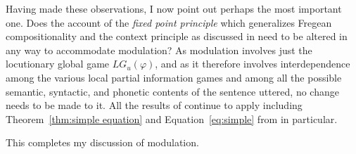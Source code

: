 Having made these observations, I now point out perhaps the most important one. Does the account of the \emph{fixed point principle} which generalizes Fregean compositionality and the context principle as discussed in  need to be altered in any way to accommodate modulation? As modulation involves just the locutionary global game $LG_u(\varphi)$, and as it therefore involves interdependence among the various local partial information games and among all the possible semantic, syntactic, and phonetic contents of the sentence uttered, no change needs to be made to it. All the results of  continue to apply including Theorem~\ref{thm:simple equation} and Equation~\ref{eq:simple} from  in particular.

This completes my discussion of modulation.


